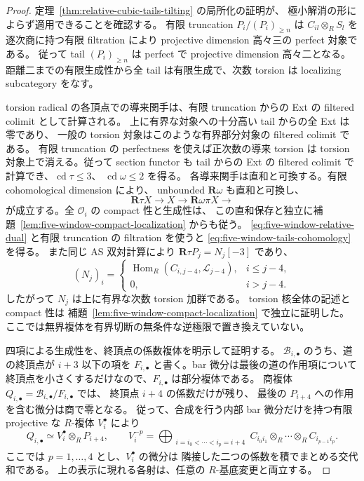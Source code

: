 \begin{proof}
定理~\ref{thm:relative-cubic-tails-tilting} の局所化の証明が、
極小解消の形によらず適用できることを確認する。
有限 truncation $P_i/(P_i)_{\ge n}$ は
$C_{il}\otimes_RS_l$ を逐次商に持つ有限 filtration により
projective dimension 高々三の perfect 対象である。
従って tail $(P_i)_{\ge n}$ は perfect で projective dimension 高々二となる。
距離二までの有限生成性から全 tail は有限生成で、次数 torsion は localizing
subcategory をなす。

torsion radical の各頂点での導来関手は、有限 truncation からの Ext の
filtered colimit として計算される。
上に有界な対象への十分高い tail からの全 Ext は零であり、
一般の torsion 対象はこのような有界部分対象の filtered colimit である。
有限 truncation の perfectness を使えば正次数の導来 torsion は
torsion 対象上で消える。従って section functor も tail からの Ext の
filtered colimit で計算でき、$\operatorname{cd}\tau\le3$、
$\operatorname{cd}\omega\le2$ を得る。
各導来関手は直和と可換する。有限 cohomological dimension により、
unbounded $\mathbf R\omega$ も直和と可換し、
\[
 \mathbf R\tau X\longrightarrow X\longrightarrow\mathbf R\omega\pi X\longrightarrow
\]
が成立する。全 $\mathcal O_i$ の compact 性と生成性は、
この直和保存と独立に補題~\ref{lem:five-window-compact-localization} からも従う。
\eqref{eq:five-window-relative-dual} と有限 truncation の filtration を使うと
\eqref{eq:five-window-tails-cohomology} を得る。
また同じ AS 双対計算により $\mathbf R\tau P_j=N_j[-3]$ であり、
\[
 (N_j)_i=\begin{cases}
 \operatorname{Hom}_R(C_{i,j-4},\mathcal L_{j-4}),&i\le j-4,\\
 0,&i>j-4.
 \end{cases}
\]
したがって $N_j$ は上に有界な次数 torsion 加群である。
torsion 核全体の記述と compact 性は
補題~\ref{lem:five-window-compact-localization} で独立に証明した。
ここでは無界複体を有界切断の無条件な逆極限で置き換えていない。

四項による生成性を、終頂点の係数複体を明示して証明する。
$\mathcal B_{i,\bullet}$ のうち、道の終頂点が $i+3$ 以下の項を
$F_{i,\bullet}$ と書く。bar 微分は最後の道の作用項について
終頂点を小さくするだけなので、$F_{i,\bullet}$ は部分複体である。
商複体 $Q_{i,\bullet}=\mathcal B_{i,\bullet}/F_{i,\bullet}$ では、
終頂点 $i+4$ の係数だけが残り、
最後の $P_{i+4}$ への作用を含む微分は商で零となる。
従って、合成を行う内部 bar 微分だけを持つ有限 projective な
$R$-複体 $V_i^\bullet$ により
\[
 Q_{i,\bullet}\simeq V_i^\bullet\otimes_R P_{i+4},
 \qquad
 V_i^{-p}=
 \!\!\!\!\bigoplus_{\substack{i=i_0<\cdots<i_p=i+4}}\!\!\!
 C_{i_0i_1}\otimes_R\cdots\otimes_R C_{i_{p-1}i_p}.
 \tag{BW-terminal}\label{eq:five-window-terminal-complex}
\]
ここでは $p=1,\ldots,4$ とし、$V_i^\bullet$ の微分は
隣接した二つの係数を積でまとめる交代和である。
上の表示に現れる各射は、任意の $R$-基底変更と両立する。


\end{proof}

